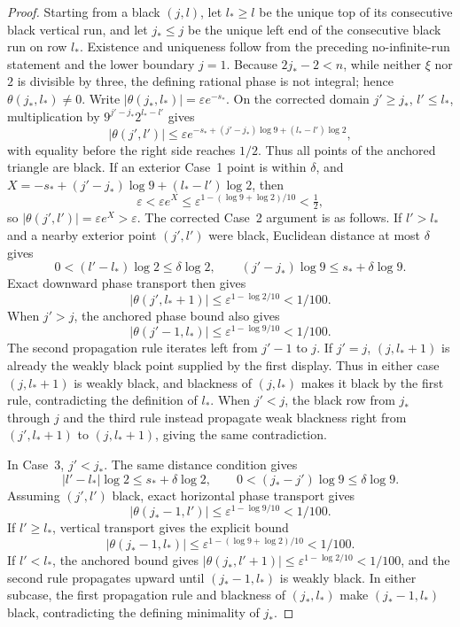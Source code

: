 \begin{proof}
Starting from a black \((j,l)\), let \(l_*\ge l\) be the unique top of its
consecutive black vertical run, and let \(j_*\le j\) be the unique left end
of the consecutive black run on row \(l_*\).  Existence and uniqueness follow
from the preceding no-infinite-run statement and the lower boundary
\(j=1\).  Because \(2j_*-2<n\), while neither \(\xi\) nor \(2\) is
divisible by three, the defining rational phase is not integral; hence
\(\theta(j_*,l_*)\ne0\).  Write
\(|\theta(j_*,l_*)|=\varepsilon e^{-s_*}\).  On the corrected domain
\(j'\ge j_*\), \(l'\le l_*\), multiplication by
\(9^{j'-j_*}2^{l_*-l'}\) gives
\[
 |\theta(j',l')|\le
 \varepsilon e^{-s_*+(j'-j_*)\log9+(l_*-l')\log2},
\]
with equality before the right side reaches \(1/2\).  Thus all points of the
anchored triangle are black.  If an exterior Case~1 point is within
\(\delta\), and
\(X=-s_*+(j'-j_*)\log9+(l_*-l')\log2\), then
\[
 \varepsilon<\varepsilon e^X
 \le\varepsilon^{1-(\log9+\log2)/10}<\tfrac12,
\]
so \(|\theta(j',l')|=\varepsilon e^X>\varepsilon\).  The corrected Case~2
argument is as follows.  If \(l'>l_*\) and a nearby exterior point
\((j',l')\) were black, Euclidean distance at most \(\delta\) gives
\[
 0<(l'-l_*)\log2\le\delta\log2,
 \qquad
 (j'-j_*)\log9\le s_*+\delta\log9.
\]
Exact downward phase transport then gives
\[
 |\theta(j',l_*+1)|
 \le\varepsilon^{1-\log2/10}<1/100.
\]
When \(j'>j\), the anchored phase bound also gives
\[
 |\theta(j'-1,l_*)|
 \le\varepsilon^{1-\log9/10}<1/100.
\]
The second propagation rule iterates left from \(j'-1\) to \(j\).  If
\(j'=j\), \((j,l_*+1)\) is already the weakly black point supplied by the
first display.  Thus in either case \((j,l_*+1)\) is weakly black, and
blackness of \((j,l_*)\) makes it black by the first rule, contradicting the
definition of \(l_*\).  When \(j'<j\), the black row from \(j_*\) through
\(j\) and the third rule instead propagate weak blackness right from
\((j',l_*+1)\) to \((j,l_*+1)\), giving the same contradiction.

In Case~3, \(j'<j_*\).  The same distance condition gives
\[
 |l'-l_*|\log2\le s_*+\delta\log2,
 \qquad 0<(j_*-j')\log9\le\delta\log9.
\]
Assuming \((j',l')\) black, exact horizontal phase transport gives
\[
 |\theta(j_*-1,l')|
 \le\varepsilon^{1-\log9/10}<1/100.
\]
If \(l'\ge l_*\), vertical transport gives the explicit bound
\[
 |\theta(j_*-1,l_*)|
 \le\varepsilon^{1-(\log9+\log2)/10}<1/100.
\]
If \(l'<l_*\), the anchored bound gives
\(|\theta(j_*,l'+1)|\le\varepsilon^{1-\log2/10}<1/100\), and the second
rule propagates upward until \((j_*-1,l_*)\) is weakly black.  In either
subcase, the first propagation rule and blackness of \((j_*,l_*)\) make
\((j_*-1,l_*)\) black, contradicting the defining minimality of \(j_*\).


\end{proof}
